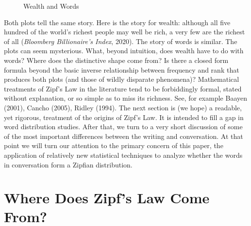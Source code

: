 \documentclass[12pt]{article}
\begin{document}
\begin{figure}[h!]
    \centering
    \hfill
    \caption{Wealth and Words}%
\end{figure}
Both plots tell the same story.  Here is the story for wealth:  although all five hundred of the world's richest people may well be rich, a very few are the richest of all (\emph{Bloomberg Billionaire's Index}, 2020).  The story of words is similar. The plots can seem mysterious. What, beyond intuition, does wealth have to do with words?  Where does the distinctive shape come from? Is there a closed form formula beyond the basic inverse relationship between frequency and rank that produces both plots (and those of wildly disparate phenomena)?  Mathematical treatments of Zipf's Law in the literature tend to be forbiddingly formal, stated without explanation, or so simple as to miss its richness.  See, for example Baayen (2001), Cancho (2005), Ridley (1994).   The next section is (we hope) a readable, yet rigorous, treatment of the origins of Zipf's Law.  It is intended to fill a gap in word distribution studies.  After that, we turn to a very short discussion of some of the most important differences between the writing and conversation.  At that point we will turn our attention to the primary concern of this paper, the application of relatively new statistical techniques to analyze whether the words in conversation form a Zipfian distribution.


\section{Where Does Zipf's Law Come From?}
\end{document}
